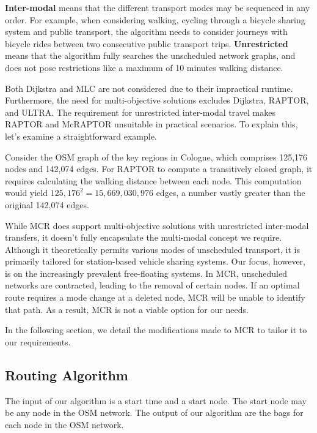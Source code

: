 \textbf{Inter-modal} means that the different transport modes may be sequenced in any order.
For example, when considering walking, cycling through a bicycle sharing system and public transport, the algorithm needs to consider journeys with bicycle rides between two consecutive public transport trips.
\textbf{Unrestricted} means that the algorithm fully searches the unscheduled network graphs, and does not pose restrictions like a maximum of 10 minutes walking distance.


Both Dijkstra and MLC are not considered due to their impractical runtime.
Furthermore, the need for multi-objective solutions excludes Dijkstra, RAPTOR, and ULTRA.
The requirement for unrestricted inter-modal travel makes RAPTOR and McRAPTOR unsuitable in practical scenarios.
To explain this, let's examine a straightforward example.

Consider the OSM graph of the key regions in Cologne, which comprises 125,176 nodes and 142,074 edges.
For RAPTOR to compute a transitively closed graph, it requires calculating the walking distance between each node.
This computation would yield \(125,176^2 = 15,669,030,976\) edges, a number vastly greater than the original 142,074 edges.

While MCR does support multi-objective solutions with unrestricted inter-modal transfers, it doesn't fully encapsulate the multi-modal concept we require.
Although it theoretically permits various modes of unscheduled transport, it is primarily tailored for station-based vehicle sharing systems.
Our focus, however, is on the increasingly prevalent free-floating systems.
In MCR, unscheduled networks are contracted, leading to the removal of certain nodes.
If an optimal route requires a mode change at a deleted node, MCR will be unable to identify that path.
As a result, MCR is not a viable option for our needs.


In the following section, we detail the modifications made to MCR to tailor it to our requirements.

\subsection{Routing Algorithm}
\label{subs:routing_algorithm}

The input of our algorithm is a start time and a start node.
The start node may be any node in the OSM network.
The output of our algorithm are the bags for each node in the OSM network.

